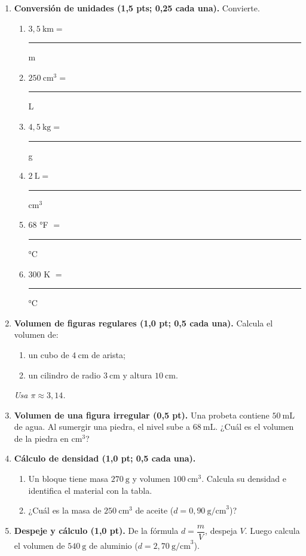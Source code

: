 \documentclass[12pt, letterpaper]{article}
\begin{document}
\begin{enumerate}[leftmargin=*, label=\textbf{\arabic*.}, itemsep=0.6em]

  \item \textbf{Conversión de unidades (1,5 pts; 0,25 cada una).} Convierte.
        \begin{enumerate}[label=\alph*), leftmargin=1.8em, itemsep=0.35em]
          \item $3{,}5\ \text{km} =$ \rule{1.8cm}{0.4pt} m
          \item $250\ \text{cm}^3 =$ \rule{1.8cm}{0.4pt} L
          \item $4{,}5\ \text{kg} =$ \rule{1.8cm}{0.4pt} g
          \item $2\ \text{L} =$ \rule{1.8cm}{0.4pt} $\text{cm}^3$
          \item $68$ °F $=$ \rule{1.8cm}{0.4pt} °C
          \item $300$ K $=$ \rule{1.8cm}{0.4pt} °C
        \end{enumerate}

  \item \textbf{Volumen de figuras regulares (1,0 pt; 0,5 cada una).} Calcula el volumen de:
        \begin{enumerate}[label=\alph*), leftmargin=1.8em, itemsep=0.3em]
          \item un cubo de $4\ \text{cm}$ de arista;
          \item un cilindro de radio $3\ \text{cm}$ y altura $10\ \text{cm}$.
        \end{enumerate}
        \textit{Usa $\pi \approx 3{,}14$.}
        \vspace{1.2cm}

  \item \textbf{Volumen de una figura irregular (0,5 pt).} Una probeta contiene
        $50\ \text{mL}$ de agua. Al sumergir una piedra, el nivel sube a $68\ \text{mL}$.
        ¿Cuál es el volumen de la piedra en $\text{cm}^3$?
        \vspace{1.0cm}

  \item \textbf{Cálculo de densidad (1,0 pt; 0,5 cada una).}
        \begin{enumerate}[label=\alph*), leftmargin=1.8em, itemsep=0.45em]
          \item Un bloque tiene masa $270\ \text{g}$ y volumen $100\ \text{cm}^3$.
                Calcula su densidad e identifica el material con la tabla.
          \item ¿Cuál es la masa de $250\ \text{cm}^3$ de aceite ($d=0{,}90\ \text{g/cm}^3$)?
        \end{enumerate}
        \vspace{1.3cm}

  \item \textbf{Despeje y cálculo (1,0 pt).} De la fórmula $d=\dfrac{m}{V}$, despeja $V$.
        Luego calcula el volumen de $540\ \text{g}$ de aluminio
        ($d=2{,}70\ \text{g/cm}^3$).
        \vspace{1.2cm}
\end{enumerate}
\end{document}
